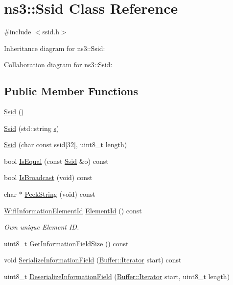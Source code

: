 \hypertarget{classns3_1_1Ssid}{}\section{ns3\+:\+:Ssid Class Reference}
\label{classns3_1_1Ssid}


{\ttfamily \#include $<$ssid.\+h$>$}



Inheritance diagram for ns3\+:\+:Ssid\+:


Collaboration diagram for ns3\+:\+:Ssid\+:
\subsection*{Public Member Functions}
\begin{DoxyCompactItemize}
\item 
\hyperlink{classns3_1_1Ssid_abb9e2c607e3d6dc0dabcf1f877b9c23c}{Ssid} ()
\item 
\hyperlink{classns3_1_1Ssid_ae724e1c260d9ed0b317e367ff5319792}{Ssid} (std\+::string \hyperlink{generate__test__data__lte__sinr_8m_ad83eeb3a142285d1243a08c6b7026df8}{s})
\item 
\hyperlink{classns3_1_1Ssid_ac6f220de4132c157a60cac67b2041a84}{Ssid} (char const ssid\mbox{[}32\mbox{]}, uint8\+\_\+t length)
\item 
bool \hyperlink{classns3_1_1Ssid_a25edb9668c80bd9dc4bd93b8ea86fe6c}{Is\+Equal} (const \hyperlink{classns3_1_1Ssid}{Ssid} \&o) const 
\item 
bool \hyperlink{classns3_1_1Ssid_aac5447b5cfcefe6d651e37e2c45b73d1}{Is\+Broadcast} (void) const 
\item 
char $\ast$ \hyperlink{classns3_1_1Ssid_a96f3c247a8ded07dfbf533358efb968d}{Peek\+String} (void) const 
\item 
\hyperlink{namespacens3_aeb185e0c8a60816016bca079f1420478}{Wifi\+Information\+Element\+Id} \hyperlink{classns3_1_1Ssid_ac244b130aaba91f9048c0a6b17af16d5}{Element\+Id} () const 
\begin{DoxyCompactList}\small\item\em Own unique Element ID. \end{DoxyCompactList}\item 
uint8\+\_\+t \hyperlink{classns3_1_1Ssid_a37e983760e2e3b027050e4adbca13385}{Get\+Information\+Field\+Size} () const 
\item 
void \hyperlink{classns3_1_1Ssid_a92e1ad0b067f1fd585ba4b8395fe3a22}{Serialize\+Information\+Field} (\hyperlink{classns3_1_1Buffer_1_1Iterator}{Buffer\+::\+Iterator} start) const 
\item 
uint8\+\_\+t \hyperlink{classns3_1_1Ssid_a50ef0315de97b0f2acfbbbe852b5688e}{Deserialize\+Information\+Field} (\hyperlink{classns3_1_1Buffer_1_1Iterator}{Buffer\+::\+Iterator} start, uint8\+\_\+t length)
\end{DoxyCompactItemize}
